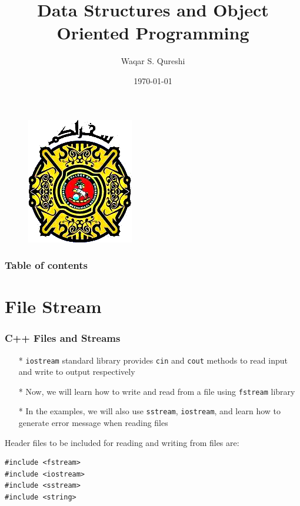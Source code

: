\documentclass{beamer}
\title[DSOOP]{Data Structures and Object Oriented Programming} %
\author{Waqar S. Qureshi} %
\institute[DMTS] %
{
NUST College of Electrical \& Mechanical Engineering. \\ %
\textit{waqar.shahid@alumni.ait.asia} %
}
\date{\today} %
\begin{document}
\begin{frame}
\titlepage %

\begin{figure}
\includegraphics[width=0.18\linewidth]{eme-logo.png}
\end{figure}

\end{frame}

\begin{frame}
\frametitle{Table of contents} %
\scriptsize{
\tableofcontents %

}
\end{frame}


\section{File Stream}

\begin{frame}[fragile]
\frametitle{C++ Files and Streams}
\begin{itemize}
\item[*] \verb|iostream| standard library provides \verb|cin| and \verb|cout| methods to read input and write to output respectively
\item[*] Now, we will learn how to write and read from a file using \verb|fstream| library
\item[*] In the examples, we will also use \verb|sstream|, \verb|iostream|, and learn how to generate error message when reading files
\end{itemize}

\medskip

Header files to be included for reading and writing from files are:

\begin{verbatim}
#include <fstream>
#include <iostream>
#include <sstream>
#include <string>
\end{verbatim}

\end{frame}
\end{document}
